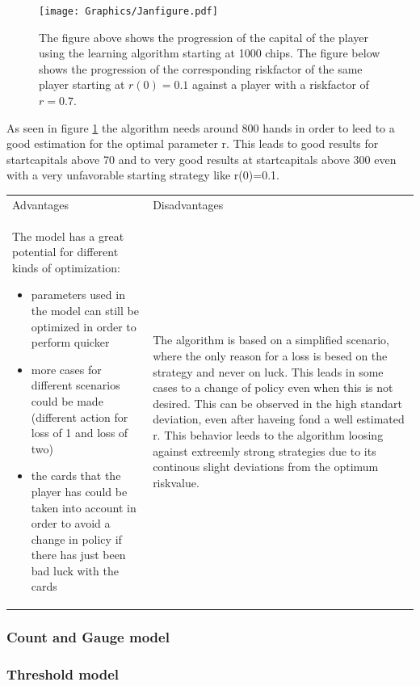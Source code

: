 \documentclass[11pt]{article}
\begin{document}
\begin{figure}[h!]
\centering
\texttt{[image: Graphics/Janfigure.pdf]}
\caption{The figure above shows the progression of the capital of the player using the learning algorithm starting at 1000 chips. The figure below shows the progression of the corresponding riskfactor of the same player starting at $r(0)=0.1$ against a player with a riskfactor of $r=0.7$.\label{Abbildung}}
\end{figure}

As seen in figure \ref{Abbildung} the algorithm needs around 800 hands in order to leed to a good estimation for the optimal parameter r. This leads to good results for startcapitals above 70 and to very good results at startcapitals above 300 even with a very unfavorable starting strategy like r(0)=0.1.
\\
\begin{tabular}{ p{7.2cm}  p{7.2cm}}
Advantages & Disadvantages\\
The model has a great potential for different kinds of optimization:
\begin{itemize}
\item parameters used in the model can still be optimized in order to perform quicker
\item more cases for different scenarios could be made (different action for loss of 1 and loss of two)
\item the cards that the player has could be taken into account in order to avoid a change in policy if there has just been bad luck with the cards 
\end{itemize}
 & The algorithm is based on a simplified scenario, where the only reason for a loss is besed on the strategy and never on luck. This leads in some cases to a change of policy even when this is not desired. This can be observed in the high standart deviation, even after haveing fond a well estimated r. This behavior leeds to the algorithm loosing against extreemly strong strategies due to its continous slight deviations from the optimum  riskvalue.\\ 
\end{tabular}

\subsubsection{Count and Gauge model}

\subsubsection{Threshold model}
\end{document}
